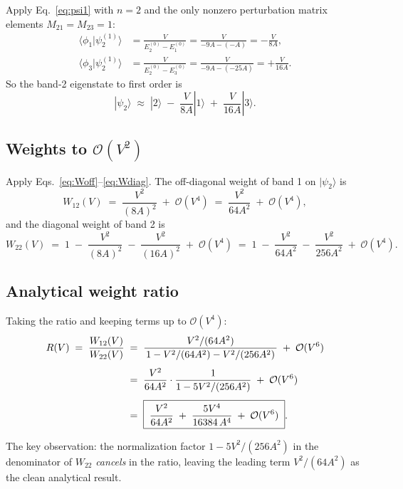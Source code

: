 \documentclass[11pt]{article}
\begin{document}
Apply Eq.~\eqref{eq:psi1} with $n=2$ and the only nonzero perturbation matrix elements $M_{21}=M_{23}=1$:
\begin{align}
\langle\phi_1|\psi_2^{(1)}\rangle &= \frac{V}{E_2^{(0)} - E_1^{(0)}} = \frac{V}{-9A - (-A)} = -\frac{V}{8A},\\[2pt]
\langle\phi_3|\psi_2^{(1)}\rangle &= \frac{V}{E_2^{(0)} - E_3^{(0)}} = \frac{V}{-9A - (-25A)} = +\frac{V}{16A}.
\end{align}
So the band-2 eigenstate to first order is
\begin{equation}
|\psi_2\rangle \;\approx\; |2\rangle \;-\; \frac{V}{8A}|1\rangle \;+\; \frac{V}{16A}|3\rangle. \label{eq:psi2}
\end{equation}

\subsection{Weights to $\mathcal O(V^2)$}

Apply Eqs.~\eqref{eq:Woff}--\eqref{eq:Wdiag}. The off-diagonal weight of band 1 on $|\psi_2\rangle$ is
\begin{equation}
W_{12}(V) \;=\; \frac{V^2}{(8A)^2} \;+\; \mathcal O(V^4) \;=\; \frac{V^2}{64 A^2} \;+\; \mathcal O(V^4),
\end{equation}
and the diagonal weight of band 2 is
\begin{equation}
W_{22}(V) \;=\; 1 \;-\; \frac{V^2}{(8A)^2} \;-\; \frac{V^2}{(16A)^2} \;+\; \mathcal O(V^4) \;=\; 1 \;-\; \frac{V^2}{64 A^2} \;-\; \frac{V^2}{256 A^2} \;+\; \mathcal O(V^4).
\end{equation}

\subsection{Analytical weight ratio}

Taking the ratio and keeping terms up to $\mathcal O(V^4)$:
\begin{align}
R(V) \;=\; \frac{W_{12}(V)}{W_{22}(V)}
&\;=\; \frac{V^2 / (64 A^2)}{\,1 - V^2/(64 A^2) - V^2/(256 A^2)\,} \;+\; \mathcal O(V^6) \notag\\[4pt]
&\;=\; \frac{V^2}{64 A^2} \cdot \frac{1}{1 - 5V^2/(256 A^2)} \;+\; \mathcal O(V^6) \notag\\[4pt]
&\;=\; \boxed{\;\frac{V^2}{64 A^2} \;+\; \frac{5 V^4}{16384\, A^4} \;+\; \mathcal O(V^6)\;}. \label{eq:ratio}
\end{align}

The key observation: the normalization factor $1 - 5V^2/(256 A^2)$ in the denominator of $W_{22}$ \emph{cancels} in the ratio, leaving the leading term $V^2/(64 A^2)$ as the clean analytical result.
\end{document}
